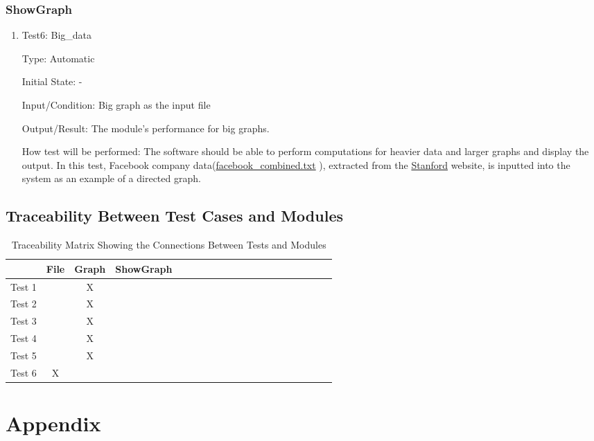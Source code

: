 \documentclass[12pt, titlepage]{article}
\begin{document}
\subsubsection{ShowGraph}
\begin{enumerate}
\item{Test6: Big\_data\\}

Type: Automatic
					
Initial State: -
					
Input/Condition: Big graph as the input file
					
Output/Result:  The module's performance for big graphs.
					
How test will be performed: The software should be able to perform computations for heavier data and larger graphs and display the output. In this test, Facebook company data(\href{https://github.com/AtiyehSayadi/Centrality-In-Graphs/tree/main/test/facebook_combined.txt}{facebook\_combined.txt} ), extracted from the \href{https://snap.stanford.edu/data/}{Stanford} website, is inputted into the system as an example of a directed graph.
\end{enumerate}

\subsection{Traceability Between Test Cases and Modules}
\begin{table}[h!]
\centering
\begin{tabular}{|c|c|c|c|c|c|c|c|c|c|c|c|c|c|c|c|c|c|c|c|}
\hline
	&File &Graph &ShowGraph\\
\hline
Test 1     & & X&  \\ \hline
Test 2     & & X&  \\ \hline
Test 3    & & X&  \\ \hline
Test 4     & & X&  \\ \hline
Test 5     & & X&  \\ \hline
Test 6     &X & &  \\ \hline

\end{tabular}
\caption{Traceability Matrix Showing the Connections Between Tests and Modules}
\label{Table:A_trace}
\end{table}

				


\newpage

\section{Appendix}
\end{document}

